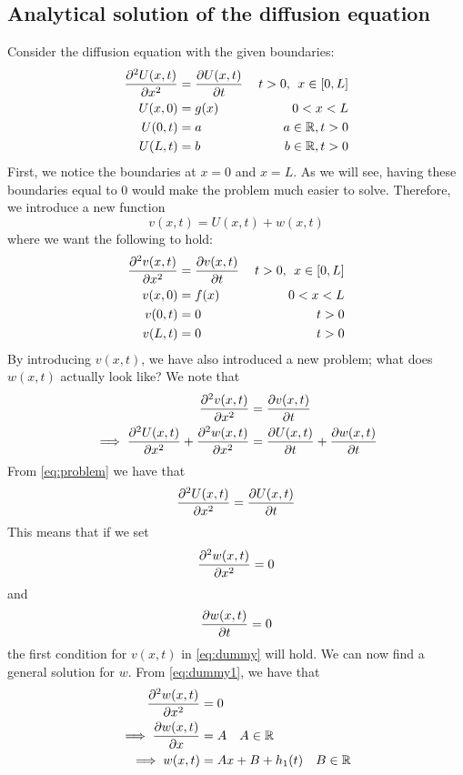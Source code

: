 \documentclass[12pt,english,a4paper]{article}
\begin{document}
\subsection{Analytical solution of the diffusion equation}
Consider the diffusion equation with the given boundaries:
\begin{equation}\label{eq:problem}
\begin{aligned}
\pdv[2]{U(x,t)}{x} &= \pdv{U(x,t)}{t} &\: t>0, \:\:x\in[0,L] \\
U(x,0) &= g(x)  &0 < x < L\\
U(0,t) &=  a & a \in \mathbb{R},  t>0 \\
U(L,t) &= b &b \in \mathbb{R}, t>0
\end{aligned}
\end{equation}
First, we notice the boundaries at \(x = 0\) and \(x = L\). As we will see, having these boundaries equal to 0 would make the problem much easier to solve. Therefore, we introduce a new function
\[
v(x,t) = U(x,t) + w(x,t)
\]
where we want the following to hold:
\begin{equation}\label{eq:dummy}
\begin{aligned}
\pdv[2]{v(x,t)}{x} &= \pdv{v(x,t)}{t} &\: t>0, \:\:x\in[0,L] \\
v(x,0) &= f(x)  &0 < x < L\\
v(0,t) &=  0 &  t>0 \\
v(L,t) &= 0 & t>0
\end{aligned}
\end{equation}
By introducing \(v(x,t)\), we have also introduced a new problem; what does \(w(x,t)\) actually look like? We note that 
\begin{alignat*}{2}
\pdv[2]{v(x,t)}{x} &= \pdv{v(x,t)}{t}  \\
\implies \pdv[2]{U(x,t)}{x} + \pdv[2]{w(x,t)}{x} &= \pdv{U(x,t)}{t} + \pdv{w(x,t)}{t} 
\end{alignat*}
From \ref{eq:problem} we have that 
\[
\pdv[2]{U(x,t)}{x} = \pdv{U(x,t)}{t}
\]
This means that if we set 
\begin{equation} \label{eq:dummy1}
 \pdv[2]{w(x,t)}{x}  = 0
\end{equation}
and 
\begin{equation} \label{eq:dummy2}
 \pdv{w(x,t)}{t} = 0 
\end{equation}
the first condition for \(v(x,t)\) in \vref{eq:dummy} will hold. We can now find a general solution for \(w\). From \vref{eq:dummy1}, we have that 
\begin{align}
	\pdv[2]{w(x,t)}{x}  &= 0 \nonumber \\
	\implies\pdv{w(x,t)}{x} &= A  \quad A \in \mathbb{R} \nonumber \\
	\implies w(x,t) &= Ax + B + h_1(t) \quad B \in \mathbb{R} \label{eq:wX}
\end{align}
\end{document}
